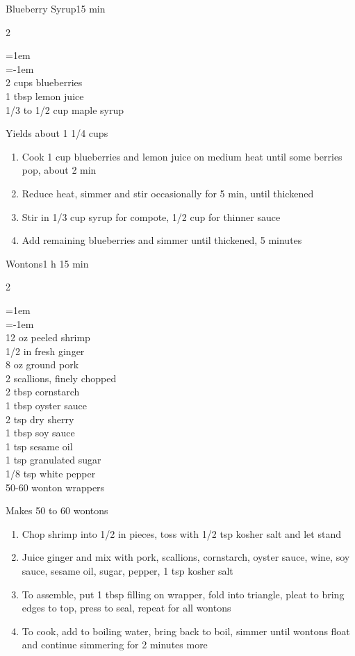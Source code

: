 \documentclass{article}
\newenvironment{recipe}[3][]
    {\begin{cardbase}[#1]{#2}{#3}
    \columnratio{0.333}
    \begin{paracol}{2}}
    {\end{paracol}\end{cardbase}}
\newenvironment{denserecipe}[3][]
    {\small
    \begin{recipe}[#1]{#2}{#3}}
    {\end{recipe}}
\newcommand{\nextcolumn}{\switchcolumn}
\newenvironment{ingredients}
    {
    \begin{obeylines}
    \vspace{\parskip}
    \setlength{\parskip}{0.25em}
    \vspace{-0.25em}
    \leftskip=1em
    \parindent=-1em}
    {\end{obeylines}}
\newenvironment{steps}
    {\begin{enumerate}[leftmargin=*,topsep=0pt]}
    {\end{enumerate}}
\newcommand{\tag}[1]{\hspace{1em}#1}
\newcommand{\symboltag}[2]{\tag{#1\hspace{0.4em}#2}}
\newcommand{\totaltime}[1]{\symboltag{\raisebox{-0.1em}{\small\StopWatchEnd}}{#1}}
\begin{document}
\begin{recipe}{Blueberry Syrup}{\totaltime{15 min}}
\begin{ingredients}
2 cups blueberries
1 tbsp lemon juice
1/3 to 1/2 cup maple syrup
\end{ingredients}
\nextcolumn
Yields about 1 1/4 cups
\begin{steps}
\item Cook 1 cup blueberries and lemon juice on medium heat until some berries pop, about 2 min
\item Reduce heat, simmer and stir occasionally for 5 min, until thickened
\item Stir in 1/3 cup syrup for compote, 1/2 cup for thinner sauce
\item Add remaining blueberries and simmer until thickened, 5 minutes
\end{steps}
\end{recipe}

\begin{denserecipe}{Wontons}{\totaltime{1 h 15 min}}
\begin{ingredients}
12 oz peeled shrimp
1/2 in fresh ginger
8 oz ground pork
2 scallions, finely chopped
2 tbsp cornstarch
1 tbsp oyster sauce
2 tsp dry sherry
1 tbsp soy sauce
1 tsp sesame oil
1 tsp granulated sugar
1/8 tsp white pepper
50-60 wonton wrappers
\end{ingredients}
\nextcolumn
Makes 50 to 60 wontons
\begin{steps}
\item Chop shrimp into 1/2 in pieces, toss with 1/2 tsp kosher salt and let stand
\item Juice ginger and mix with pork, scallions, cornstarch, oyster sauce, wine, soy sauce, sesame oil, sugar, pepper, 1 tsp kosher salt
\item To assemble, put 1 tbsp filling on wrapper, fold into triangle, pleat to bring edges to top, press to seal, repeat for all wontons
\item To cook, add to boiling water, bring back to boil, simmer until wontons float and continue simmering for 2 minutes more
\end{steps}
\end{denserecipe}
\end{document}
